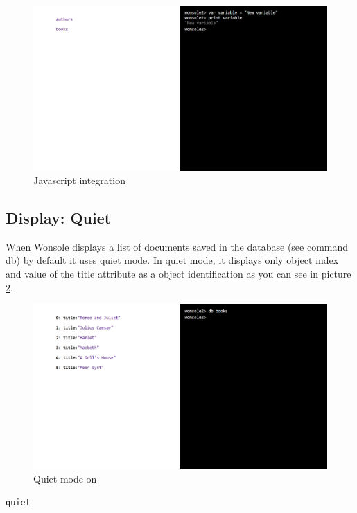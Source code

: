 \begin{figure}
\centering
\includegraphics[width=\textwidth]{../../manual/screenshot/wonsole2/wonsole2-15.png}
\caption{Javascript integration}
\label{wonsole2-15}
\end{figure}

\subsection{Display: Quiet}
When Wonsole displays a list of documents saved in the database (see command
db) by default it uses quiet mode. In quiet mode, it displays only object index and
value of the title attribute as a object identification as you can see in
picture \ref{wonsole2-18}.

\begin{figure}
\centering
\includegraphics[width=\textwidth]{../../manual/screenshot/wonsole2/wonsole2-18.png}
\caption{Quiet mode on}
\label{wonsole2-18}
\end{figure}

\begin{verbatim}
quiet
\end{verbatim}

